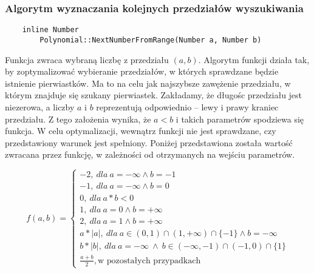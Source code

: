 \documentclass[oneside,a4paper]{book}
\begin{document}
	\subsubsection{Algorytm wyznaczania kolejnych przedziałów wyszukiwania}
	\begin{lstlisting}
	inline Number
	    Polynomial::NextNumberFromRange(Number a, Number b)
	\end{lstlisting}
	
	Funkcja zwraca wybraną liczbę z przedziału $(a,b)$. Algorytm funkcji działa tak, by zoptymalizować wybieranie przedziałów, w których sprawdzane będzie istnienie pierwiastków. Ma to na celu jak najszybsze zawężenie przedziału, w którym znajduje się szukany pierwiastek. Zakładamy, że długośc przedziału jest niezerowa, a liczby $a$ i $b$ reprezentują odpowiednio -- lewy i prawy kraniec przedziału. Z tego założenia wynika, że $a<b$ i takich parametrów spodziewa się funkcja. W celu optymalizacji, wewnątrz funkcji nie jest sprawdzane, czy przedstawiony warunek jest spełniony. Poniżej przedstawiona została wartość zwracana przez funkcję, w zależności od otrzymanych na wejściu parametrów.
	
	\[
	f(a,b)=\left\{
	\begin{array}{ll}
	-2,\ dla\ a=-\infty \wedge b=-1\\
	-1,\ dla\ a=-\infty \wedge b=0\\
	0,\ dla\ a*b<0\\
	1,\ dla\ a=0 \wedge b=+\infty\\
	2,\ dla\ a=1 \wedge b=+\infty\\
	a*|a|,\ dla\ a \in (0,1) \cap (1,+\infty) \cap \{-1\} \wedge b=-\infty\ \\
	b*|b|,\ dla\ a=-\infty\ \wedge \ b \in (-\infty,-1) \cap (-1,0) \cap \{1\}\\
	\frac{a+b}{2},\text{w pozostałych przypadkach}
	\end{array}
	\right.
	\]
	
\end{document}
